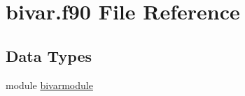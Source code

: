 \hypertarget{bivar_8f90}{\section{bivar.\+f90 File Reference}
\label{bivar_8f90}
}
\subsection*{Data Types}
\begin{DoxyCompactItemize}
\item 
module \hyperlink{classbivarmodule}{bivarmodule}
\end{DoxyCompactItemize}
